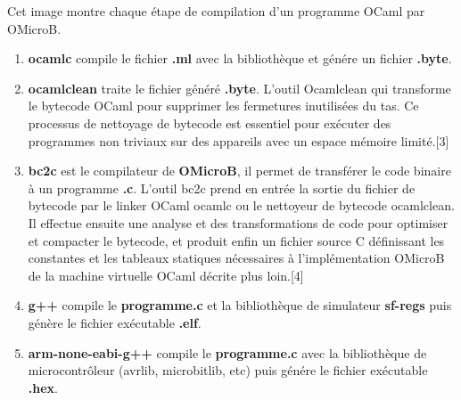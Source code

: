 \documentclass[14px]{article}
\begin{document}
\begin{figure}
\end{figure}

Cet image montre chaque étape de compilation d'un programme OCaml par OMicroB.
\begin{enumerate}
	\item \textbf{ocamlc} compile le fichier \textbf{.ml} avec la bibliothèque et génére un fichier \textbf{.byte}.
  \item \textbf{ocamlclean} traite le fichier généré \textbf{.byte}. L'outil Ocamlclean qui transforme le bytecode OCaml pour supprimer les fermetures inutilisées du tas. Ce processus de nettoyage de bytecode est essentiel pour exécuter des programmes non triviaux sur des appareils avec un espace mémoire limité.[3]
 \item \textbf{bc2c} est le compilateur de \textbf{OMicroB}, il permet de transférer le code binaire à un programme \textbf{.c}. L'outil bc2c prend en entrée la sortie du fichier de bytecode par le linker OCaml ocamlc ou le nettoyeur de bytecode ocamlclean. Il effectue ensuite une analyse et des transformations de code pour optimiser et compacter le bytecode, et produit enfin un fichier source C définissant les constantes et les tableaux statiques nécessaires à l'implémentation OMicroB de la machine virtuelle OCaml décrite plus loin.[4]
	\item \textbf{g++} compile le \textbf{programme.c} et la bibliothèque de simulateur \textbf{sf-regs} puis génère le fichier exécutable \textbf{.elf}.
	\item \textbf{arm-none-eabi-g++} compile le \textbf{programme.c} avec la bibliothèque de microcontrôleur (avrlib, microbitlib, etc) puis génére le fichier exécutable \textbf{.hex}.\\
\end{enumerate}
\end{document}
